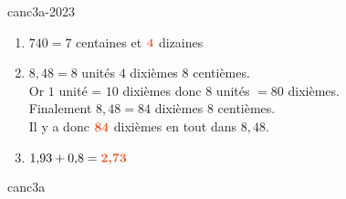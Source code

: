 \begin{EXO}{}{canc3a-2023}
\begin{enumerate}[itemsep=1em, label=\arabic*)]
\item $740 = 7$ centaines et ${\color[HTML]{f15929}\boldsymbol{4}}$ dizaines
\item $8{,}48 = 8$ unités $4$ dixièmes $8$ centièmes.\\Or $1$ unité = $10$ dixièmes donc $8$ unités $= 80$ dixièmes.\\Finalement $8{,}48 = 84$ dixièmes $8$ centièmes.\\Il y a donc ${\color[HTML]{f15929}\boldsymbol{84}}$ dixièmes en tout dans $8{,}48$.
\item $1{,}93+ 0{,}8={\color[HTML]{f15929}\boldsymbol{2{,}73}}$
\end{enumerate}



\end{EXO}
\def\points{1}
\def\rdifficulty{1}
\begin{EXO}{}{canc3a}


\end{EXO}
